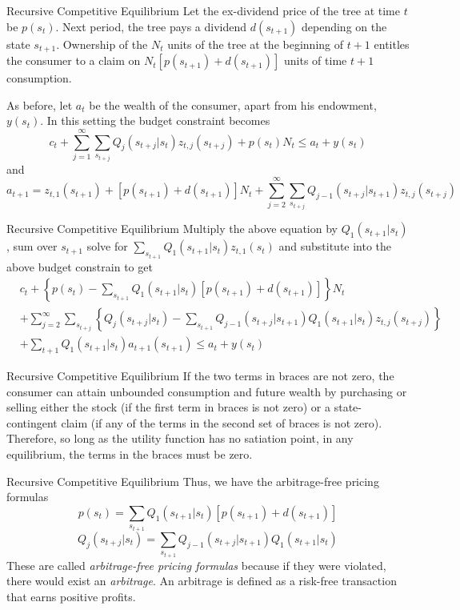 \documentclass[aspectratio=169,xcolor=dvipsnames]{beamer}
\begin{document}
\begin{frame}{Recursive Competitive Equilibrium}
    Let the ex-dividend price of the tree at time $t$ be $p(s_t)$. Next period, the tree pays a dividend $d(s_{t+1})$ depending on the state $s_{t+1}$. Ownership of the $N_t$ units of the tree at the beginning of $t+1$ entitles the consumer to a claim on $N_t [p(s_{t+1}) + d(s_{t+1})]$ units of time $t+1$ consumption.

    As before, let $a_t$ be the wealth of the consumer, apart from his endowment, $y(s_t)$. In this setting the budget constraint becomes
    \[
        c_t + \sum_{j=1}^\infty \sum_{s_{t+j}} Q_j(s_{t+j} | s_t) z_{t,j}(s_{t+j}) + p(s_t) N_t \le a_t + y(s_t)
    \]
    and
    \[
        a_{t+1} = z_{t,1}(s_{t+1}) + [p(s_{t+1}) + d(s_{t+1})] N_t + \sum_{j=2}^\infty \sum_{s_{t+j}} Q_{j-1}(s_{t+j} | s_{t+1}) z_{t,j}(s_{t+j})
    \]
\end{frame}

\begin{frame}{Recursive Competitive Equilibrium}
    Multiply the above equation by $Q_1(s_{t+1} | s_t)$, sum over $s_{t+1}$ solve for $\sum_{s_{t+1}} Q_1(s_{t+1} | s_t) z_{t,1}(s_t)$ and substitute into the above budget constrain to get
    \begin{align*}
        & c_t + \left\{ p(s_t) - \sum_{s_{t+1}} Q_1(s_{t+1} | s_t)[p(s_{t+1}) + d(s_{t+1})]\right\} N_t \\
        & + \sum_{j=2}^\infty \sum_{s_{t+j}} \left\{ Q_j(s_{t+j} | s_t) - \sum_{s_{t+1}} Q_{j-1}(s_{t+j} | s_{t+1}) Q_1(s_{t+1} | s_t) z_{t,j}(s_{t+j})\right\} \\
        & + \sum_{t+1} Q_1(s_{t+1} | s_t) a_{t+1}(s_{t+1}) \le a_t + y(s_t)
    \end{align*}
\end{frame}

\begin{frame}{Recursive Competitive Equilibrium}
    If the two terms in braces are not zero, the consumer can attain unbounded consumption and future wealth by purchasing or selling either the stock (if the first term in braces is not zero) or a state-contingent claim (if any of the terms in the second set of braces is not zero). Therefore, so long as the utility function has no satiation point, in any equilibrium, the terms in the braces must be zero.
\end{frame}

\begin{frame}{Recursive Competitive Equilibrium}
    Thus, we have the arbitrage-free pricing formulas
    \[
        p(s_t) = \sum_{s_{t+1}} Q_1(s_{t+1} | s_t)[p(s_{t+1}) + d(s_{t+1})]
    \]
    \[
        Q_j(s_{t+j} | s_t) = \sum_{s_{t+1}} Q_{j-1}(s_{t+j} | s_{t+1}) Q_1(s_{t+1} | s_t)
    \]
    These are called \emph{arbitrage-free pricing formulas} because if they were violated, there would exist an \emph{arbitrage}. An arbitrage is defined as a risk-free transaction that earns positive profits.
\end{frame}
\end{document}
